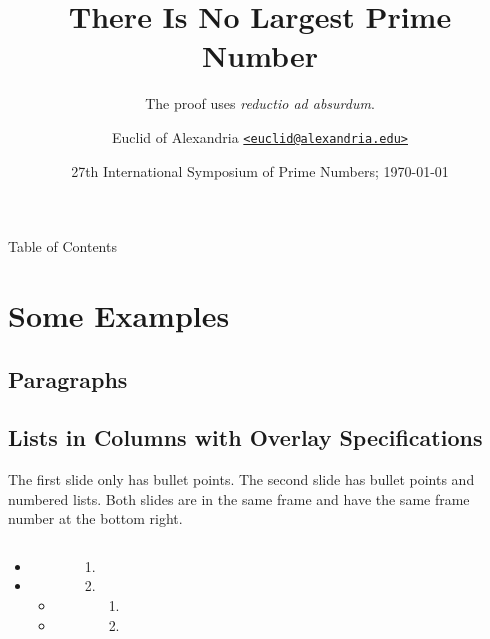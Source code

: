 \documentclass[aspectratio=169,xcolor={svgnames}]{beamer}
\title[Prime Numbers]{There Is No Largest Prime Number}
\subtitle[\textit{reductio ad absurdum}]
  {The proof uses \textit{reductio ad absurdum}.}
\author[Euclid of Alexandria]{Euclid of Alexandria
  \href{mailto:euclid@alexandria.edu}{\texttt{<euclid@alexandria.edu>}}}
\institute[Musaeum]{Musaeum of Alexandria}
\date[ISPN \the\year]{27th International Symposium of Prime Numbers; \today}
\begin{document}
\begin{frame}
  \titlepage
\end{frame}

\begin{frame}{Table of Contents}
  \tableofcontents
\end{frame}

\section{Some Examples}

\subsection{Paragraphs}
\begin{frame}{\insertsubsectionhead}
  \lipsum[1][1-5]

  \vspace{8pt}
  \lipsum[2][1-5]
\end{frame}

\subsection{Lists in Columns with Overlay Specifications}
\begin{frame}{\insertsubsectionhead}
The first slide only has bullet points. The second slide has bullet points and
numbered lists. Both slides are in the same frame and have the same frame
number at the bottom right.

  \begin{columns}[t]
    \begin{itemize}
      \item \lipsum[3][1]
      \item \lipsum[3][2]
      \begin{itemize}
        \item \lipsum[3][5]
        \item \lipsum[3][8]
      \end{itemize}
    \end{itemize}

    \begin{enumerate}
      \item<2-> \lipsum[3][3]
      \item<2-> \lipsum[3][4]
      \begin{enumerate}
        \item \lipsum[3][6]
        \item \lipsum[3][7]
      \end{enumerate}
    \end{enumerate}
  \end{columns}
\end{frame}
\end{document}
